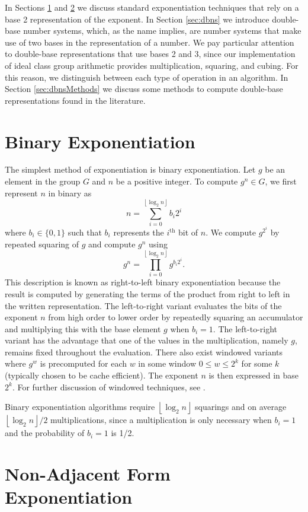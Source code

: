 \documentclass{ucalgthes1}
\theoremstyle{definition}
\newcommand{\floor}[1]{\left\lfloor #1 \right\rfloor}
\begin{document}
In Sections \ref{sec:binaryExp} and \ref{sec:naf} we discuss standard exponentiation techniques that rely on a base 2 representation of the exponent.  In Section \ref{sec:dbns} we introduce double-base number systems, which, as the name implies, are number systems that make use of two bases in the representation of a number.  We pay particular attention to double-base representations that use bases 2 and 3, since our implementation of ideal class group arithmetic provides multiplication, squaring, and cubing. For this reason, we distinguish between each type of operation in an algorithm. In Section \ref{sec:dbnsMethods} we discuss some methods to compute double-base representations found in the literature.  

\bigbreak
\section{Binary Exponentiation}
\label{sec:binaryExp}
The simplest method of exponentiation is binary exponentiation.  Let $g$ be an element in the group $G$ and $n$ be a positive integer.  To compute $g^n \in G$, we first represent $n$ in binary as
\[
	n = \sum_{i=0}^{\floor{\log_2 n}} b_i 2^i
\]
where $b_i \in \{0, 1\}$ such that $b_i$ represents the $i^{\textrm{th}}$ bit of $n$.   We compute $g^{2^i}$ by repeated squaring of $g$ and compute $g^n$ using
\[
	g^n = \prod_{i=0}^{\floor{\log_2 n}} g^{b_i 2^i}.
\]
This description is known as right-to-left binary exponentiation because the result is computed by generating the terms of the product from right to left in the written representation.  The left-to-right variant evaluates the bits of the exponent $n$ from high order to lower order by repeatedly squaring an accumulator and multiplying this with the base element $g$ when $b_i = 1$.  The left-to-right variant has the advantage that one of the values in the multiplication, namely $g$, remains fixed throughout the evaluation.  There also exist windowed variants where $g^w$ is precomputed for each $w$ in some window $0 \le w \le 2^k$ for some $k$ (typically chosen to be cache efficient). The exponent $n$ is then expressed in base $2^k$.  For further discussion of windowed techniques, see \cite{Cohen2006}.

Binary exponentiation algorithms require $\floor{\log_2 n}$ squarings and on average $\floor{\log_2 n}/2$ multiplications, since a multiplication is only necessary when $b_i = 1$ and the probability of $b_i = 1$ is 1/2.


\bigbreak
\section{Non-Adjacent Form Exponentiation}
\label{sec:naf}
\end{document}
